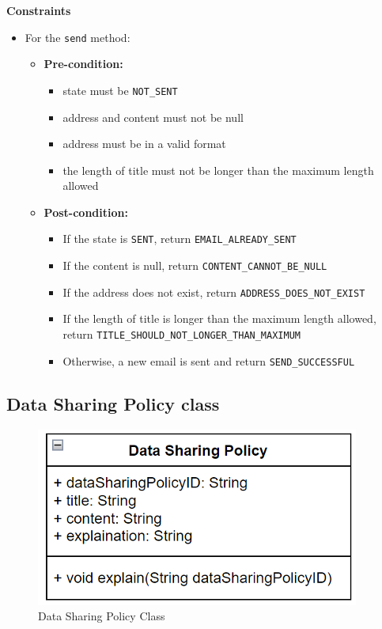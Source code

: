 \textbf{Constraints}
\begin{itemize}
    \item For the \texttt{send} method:
    \begin{itemize}
        \item \textbf{Pre-condition:}
        \begin{itemize}
            \item state must be \texttt{NOT\_SENT}
            \item address and content must not be null
            \item address must be in a valid format
            \item the length of title must not be longer than the maximum length allowed
        \end{itemize}
        \item \textbf{Post-condition:}
        \begin{itemize}
            \item If the state is \texttt{SENT}, return \texttt{EMAIL\_ALREADY\_SENT}
            \item If the content is null, return \texttt{CONTENT\_CANNOT\_BE\_NULL}
            \item If the address does not exist, return \texttt{ADDRESS\_DOES\_NOT\_EXIST}
            \item If the length of title is longer than the maximum length allowed, return \texttt{TITLE\_SHOULD\_NOT\_LONGER\_THAN\_MAXIMUM}
            \item Otherwise, a new email is sent and return \texttt{SEND\_SUCCESSFUL}
        \end{itemize}
    \end{itemize}
\end{itemize}


\subsection{Data Sharing Policy class}
\begin{figure}[H]
    \centering
    \includegraphics[width=0.5\linewidth]{picture/3-5/3-5-2.png}
    \caption{Data Sharing Policy Class}
    \label{fig:enter-label}
\end{figure}

